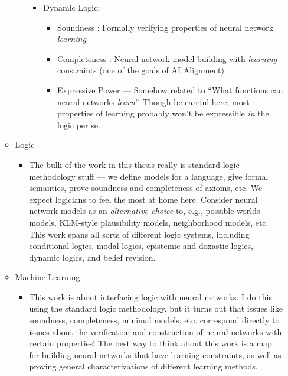 \documentclass[letterpaper]{article}
\begin{document}
\begin{enumerate}
\begin{itemize}
\begin{itemize}
\begin{itemize}
                \item Dynamic Logic:
                \begin{itemize}
                    \item Soundness : Formally verifying properties of neural network \emph{learning}
                    \item Completeness : Neural network model building with \emph{learning} constraints (one of the goals of AI Alignment)
                    \item Expressive Power --- Somehow related to ``What functions can neural networks \emph{learn}''.  Though be careful here; most properties of learning probably won't be expressible \emph{in} the logic per se.
                \end{itemize}
            \end{itemize}
        \end{itemize}
        
        \item Logic
        \begin{itemize}
            \item The bulk of the work in this thesis really is standard logic methodology stuff --- we define models for a language, give formal semantics, prove soundness and completeness of axioms, etc.  We expect logicians to feel the most at home here.  Consider neural network models as an \emph{alternative choice} to, e.g., possible-worlds models, KLM-style plausibility models, neighborhood models, etc.  This work spans all sorts of different logic systems, including conditional logics, modal logics, epistemic and doxastic logics, dynamic logics, and belief revision.
        \end{itemize}

        \item Machine Learning
        \begin{itemize}
            \item This work is about interfacing logic with neural networks.  I do this using the standard logic methodology, but it turns out that issues like soundness, completeness, minimal models, etc. correspond directly to issues about the verification and construction of neural networks with certain properties!  The best way to think about this work is a map for building neural networks that have learning constraints, as well as proving general characterizations of different learning methods.
        \end{itemize}


\end{itemize}
\end{enumerate}
\end{document}
